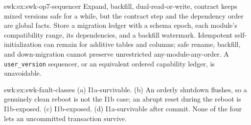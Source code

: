 \begin{pdSolution}{swk:ex:swk-op7-sequencer}
Expand, backfill, dual-read-or-write, contract keeps mixed versions safe for a while, but the contract step and the dependency order are global facts. Store a migration ledger with a schema epoch, each module's compatibility range, its dependencies, and a backfill watermark. Idempotent self-initialization can remain for additive tables and columns; safe rename, backfill, and down-migration cannot preserve unrestricted any-module-any-order. A \texttt{user\_version} sequencer, or an equivalent ordered capability ledger, is unavoidable.
\end{pdSolution}
\begin{pdSolution}{swk:ex:swk-fault-classes}
(a) I1a-survivable. (b) An orderly shutdown flushes, so a genuinely clean reboot is not the I1b case; an abrupt reset during the reboot is I1b-exposed. (c) I1b-exposed. (d) I1a-survivable after commit. None of the four lets an uncommitted transaction survive.
\end{pdSolution}
